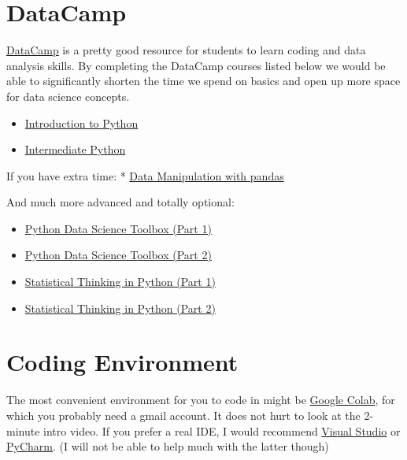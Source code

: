 \documentclass[
  letterpaper,
  DIV=11,
  numbers=noendperiod]{scrreprt}
\providecommand{\tightlist}{%
  \setlength{\itemsep}{0pt}\setlength{\parskip}{0pt}}\usepackage{longtable,booktabs,array}
\begin{document}
\hypertarget{datacamp}{%
\section*{DataCamp}\label{datacamp}}

\href{https://app.datacamp.com/}{DataCamp} is a pretty good resource for
students to learn coding and data analysis skills. By completing the
DataCamp courses listed below we would be able to significantly shorten
the time we spend on basics and open up more space for data science
concepts.

\begin{itemize}
\tightlist
\item
  \href{https://app.datacamp.com/learn/courses/intro-to-python-for-data-science}{Introduction
  to Python}
\item
  \href{https://app.datacamp.com/learn/courses/intermediate-python}{Intermediate
  Python}
\end{itemize}

If you have extra time: *
\href{https://app.datacamp.com/learn/courses/data-manipulation-with-pandas}{Data
Manipulation with pandas}

And much more advanced and totally optional:

\begin{itemize}
\tightlist
\item
  \href{https://www.datacamp.com/courses/python-data-science-toolbox-part-1}{Python
  Data Science Toolbox (Part 1)}
\item
  \href{https://www.datacamp.com/courses/python-data-science-toolbox-part-2}{Python
  Data Science Toolbox (Part 2)}
\item
  \href{https://www.datacamp.com/courses/statistical-thinking-in-python-part-1}{Statistical
  Thinking in Python (Part 1)}
\item
  \href{https://www.datacamp.com/courses/statistical-thinking-in-python-part-2}{Statistical
  Thinking in Python (Part 2)}
\end{itemize}

\hypertarget{coding-environment}{%
\section*{Coding Environment}\label{coding-environment}}

The most convenient environment for you to code in might be
\href{https://colab.research.google.com/}{Google Colab}, for which you
probably need a gmail account. It does not hurt to look at the 2-minute
intro video. If you prefer a real IDE, I would recommend
\href{https://visualstudio.microsoft.com/downloads/}{Visual Studio} or
\href{https://www.jetbrains.com/pycharm/download/}{PyCharm}. (I will not
be able to help much with the latter though)
\end{document}
